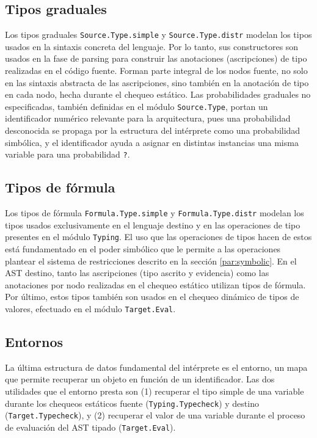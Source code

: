 \subsection{Tipos graduales} Los tipos graduales
\verb|Source.Type.simple| y \verb|Source.Type.distr| modelan los tipos
usados en la sintaxis concreta del lenguaje. Por lo tanto, sus
constructores son usados en la fase de parsing para construir las
anotaciones (ascripciones) de tipo realizadas en el código fuente.
Forman parte integral de los nodos fuente, no solo en las sintaxis
abstracta de las ascripciones, sino también en la anotación de tipo en
cada nodo, hecha durante el chequeo estático. Las probabilidades
graduales no especificadas, también definidas en el módulo
\verb|Source.Type|, portan un identificador numérico
relevante para la arquitectura, pues una probabilidad desconocida se
propaga por la estructura del intérprete como una probabilidad
simbólica, y el identificador ayuda a asignar en distintas
instancias una misma variable para una probabilidad \verb|?|.

\subsection{Tipos de fórmula} Los tipos de fórmula
\verb|Formula.Type.simple| y \verb|Formula.Type.distr| modelan los
tipos usados exclusivamente en el lenguaje destino y en las
operaciones de tipo presentes en el módulo \verb|Typing|. El uso que
las operaciones de tipos hacen de estos está fundamentado en el poder
simbólico que le permite a las operaciones plantear el sistema de
restricciones descrito en la sección \ref{par:symbolic}. En el AST
destino, tanto las ascripciones (tipo ascrito y evidencia) como las
anotaciones por nodo realizadas en el chequeo estático utilizan tipos
de fórmula. Por último, estos tipos también son usados en el chequeo
dinámico de tipos de valores, efectuado en el módulo
\verb|Target.Eval|.

\subsection{Entornos} La última estructura de datos fundamental del
intérprete es el entorno, un mapa que permite
recuperar un objeto en función de un identificador. Las dos utilidades
que el entorno presta son {(1)} recuperar el tipo simple de una
variable durante los chequeos estáticos fuente
(\verb|Typing.Typecheck|) y destino (\verb|Target.Typecheck|), y
{(2)} recuperar el valor de una variable durante el proceso de
evaluación del AST tipado (\verb|Target.Eval|).

